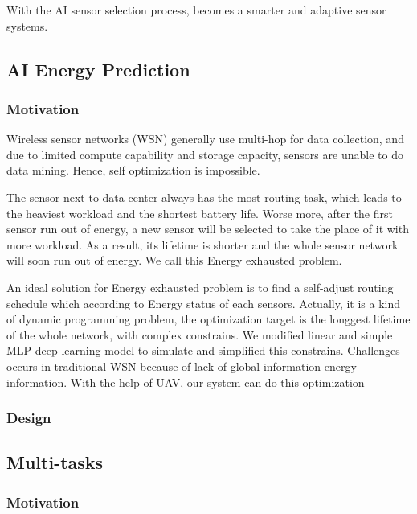 With the AI sensor selection process, {\sdn} becomes a smarter and adaptive sensor systems. 




\subsection{AI Energy Prediction}

\subsubsection{Motivation}
Wireless sensor networks (WSN)  generally use multi-hop for data collection,
and due to limited compute capability and storage capacity, sensors are unable
to do data mining. Hence, self optimization is impossible.

The sensor next to data center always has the most routing task, which leads to
the heaviest workload and the shortest battery life. Worse more, after the
first sensor run out of energy, a new sensor will be selected to take the place 
of it with more workload. As a result, its lifetime is shorter and the whole 
sensor network will soon run out of energy. We call this Energy exhausted problem.

An ideal solution for Energy exhausted problem is to find a self-adjust routing schedule which 
according to  Energy status of each sensors. Actually, it is a kind of dynamic programming 
problem, the optimization target is the longgest lifetime of the whole network, with
complex constrains. We modified linear and simple MLP deep learning model to simulate and simplified
this constrains. Challenges occurs in traditional WSN because of lack
of global information energy information. With the help of UAV, our {\sdn} system can do
this optimization


\subsubsection{Design}



\subsection{Multi-tasks}

\subsubsection{Motivation}

